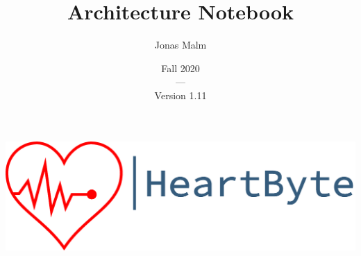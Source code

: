 \documentclass{article}
\title{Architecture Notebook}
\author{Jonas Malm}
\date{Fall 2020\\---\\Version 1.11}
\begin{document}
\maketitle

\begin{centering}
\includegraphics[scale=0.7]{logo-heartbyte}
\end{centering}

\clearpage
\end{document}
